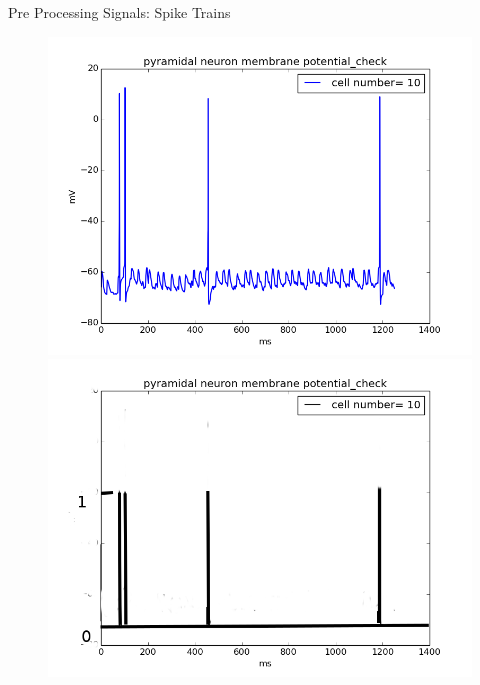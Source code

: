 \documentclass{beamer}
\begin{document}
\begin{frame}{Pre Processing Signals: Spike Trains}
\begin{figure}
\centering
\begin{minipage}{0.45\linewidth}
\centering
\includegraphics[scale=0.23]{pyr_nrn_memb_potential_in_degree_check0_0500_012501_00_0100_01_010_0.png}
\end{minipage}
\begin{minipage}{0.45\linewidth}
\centering
\includegraphics[scale=0.23]{spikes_2.png}
\end{minipage}
\end{figure}


\end{frame}
\end{document}
